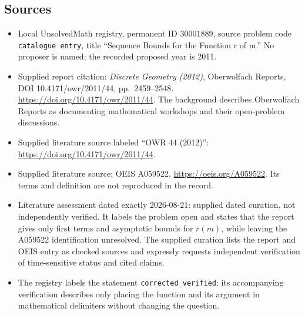 \documentclass[11pt]{article}
\begin{document}
\subsection{Sources}
\begin{itemize}
\item Local UnsolvedMath registry, permanent ID \(30001889\), source problem code \texttt{catalogue entry}, title ``Sequence Bounds for the Function r of m.'' No proposer is named; the recorded proposed year is 2011.
\item Supplied report citation: \emph{Discrete Geometry (2012)}, Oberwolfach Reports, DOI 10.4171/owr/2011/44, pp.~2459--2548. \url{https://doi.org/10.4171/owr/2011/44}. The background describes Oberwolfach Reports as documenting mathematical workshops and their open-problem discussions.
\item Supplied literature source labeled ``OWR 44 (2012)'': \url{https://doi.org/10.4171/owr/2011/44}.
\item Supplied literature source: OEIS A059522, \url{https://oeis.org/A059522}. Its terms and definition are not reproduced in the record.
\item Literature assessment dated exactly 2026-08-21: supplied dated curation, not independently verified. It labels the problem open and states that the report gives only first terms and asymptotic bounds for \(r(m)\), while leaving the A059522 identification unresolved. The supplied curation lists the report and OEIS entry as checked sources and expressly requests independent verification of time-sensitive status and cited claims.
\item The registry labels the statement \texttt{corrected\_verified}; its accompanying verification describes only placing the function and its argument in mathematical delimiters without changing the question.
\end{itemize}
\end{document}
